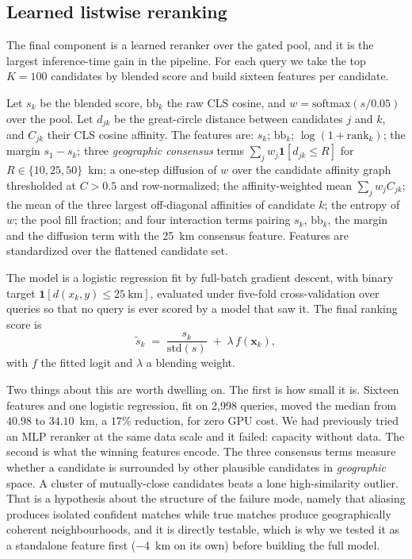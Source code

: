 \documentclass[11pt,a4paper]{article}
\begin{document}
\subsection{Learned listwise reranking}
\label{sec:e7}

The final component is a learned reranker over the gated pool, and it is the largest
inference-time gain in the pipeline. For each query we take the top $K = 100$ candidates by
blended score and build sixteen features per candidate.

Let $s_k$ be the blended score, $\mathrm{bb}_k$ the raw CLS cosine, and
$w = \mathrm{softmax}(s / 0.05)$ over the pool. Let $d_{jk}$ be the great-circle distance
between candidates $j$ and $k$, and $C_{jk}$ their CLS cosine affinity. The features are:
$s_k$; $\mathrm{bb}_k$; $\log(1 + \mathrm{rank}_k)$; the margin $s_1 - s_k$; three
\emph{geographic consensus} terms $\sum_j w_j \mathbf{1}[d_{jk} \le R]$ for
$R \in \{10, 25, 50\}$~km; a one-step diffusion of $w$ over the candidate affinity graph
thresholded at $C > 0.5$ and row-normalized; the affinity-weighted mean
$\sum_j w_j C_{jk}$; the mean of the three largest off-diagonal affinities of candidate $k$;
the entropy of $w$; the pool fill fraction; and four interaction terms pairing $s_k$,
$\mathrm{bb}_k$, the margin and the diffusion term with the 25~km consensus feature. Features
are standardized over the flattened candidate set.

The model is a logistic regression fit by full-batch gradient descent, with binary target
$\mathbf{1}[d(x_k, y) \le 25\ \mathrm{km}]$, evaluated under five-fold cross-validation over
queries so that no query is ever scored by a model that saw it. The final ranking score is
\begin{equation}
\tilde{s}_k \;=\; \frac{s_k}{\mathrm{std}(s)} \;+\; \lambda \, f(\mathbf{x}_k),
\end{equation}
with $f$ the fitted logit and $\lambda$ a blending weight.

Two things about this are worth dwelling on. The first is how small it is. Sixteen features
and one logistic regression, fit on 2{,}998 queries, moved the median from $40.98$ to
$34.10$~km, a $17\%$ reduction, for zero GPU cost. We had previously tried an MLP reranker at
the same data scale and it failed: capacity without data. The second is what the winning
features encode. The three consensus terms measure whether a candidate is surrounded by other
plausible candidates in \emph{geographic} space. A cluster of mutually-close candidates beats
a lone high-similarity outlier. That is a hypothesis about the structure of the failure mode,
namely that aliasing produces isolated confident matches while true matches produce
geographically coherent neighbourhoods, and it is directly testable, which is why we tested it
as a standalone feature first ($-4$~km on its own) before building the full model.
\end{document}
